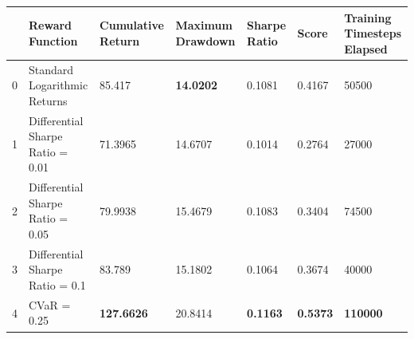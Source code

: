 \begin{tabular}{lllllll}
\toprule
 & Reward Function & Cumulative Return & Maximum Drawdown & Sharpe Ratio & Score & Training Timesteps Elapsed \\
\midrule
0 & Standard Logarithmic Returns & 85.417 & \textbf{14.0202} & 0.1081 & 0.4167 & 50500 \\
1 & Differential Sharpe Ratio = 0.01 & 71.3965 & 14.6707 & 0.1014 & 0.2764 & 27000 \\
2 & Differential Sharpe Ratio = 0.05 & 79.9938 & 15.4679 & 0.1083 & 0.3404 & 74500 \\
3 & Differential Sharpe Ratio = 0.1 & 83.789 & 15.1802 & 0.1064 & 0.3674 & 40000 \\
4 & CVaR = 0.25 & \textbf{127.6626} & 20.8414 & \textbf{0.1163} & \textbf{0.5373} & \textbf{110000} \\
\bottomrule
\end{tabular}
